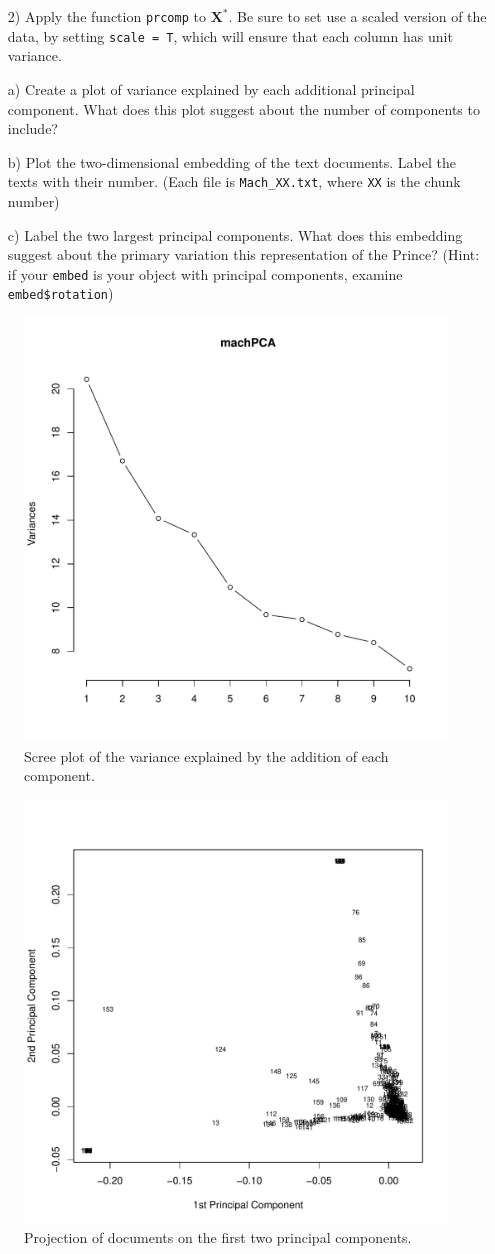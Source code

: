 \documentclass[12pt,letterpaper]{article}
\begin{document}
\begin{itemize}
\item[2)] Apply the function {\tt prcomp} to $\boldsymbol{X}^{*}$. Be sure to set use a scaled version of the data, by setting {\tt scale = T}, which will ensure that each column has unit variance.
\item[a)] Create a plot of variance explained by each additional principal component. What does this plot suggest about the number of components to include?
\item[b)] Plot the two-dimensional embedding of the text documents.  Label the texts with their number.  (Each file is {\tt Mach\_XX.txt}, where {\tt XX} is the chunk number)
\item[c)] Label the two largest principal components.  What does this embedding suggest about the primary variation this representation of the Prince?  (Hint: if your {\tt embed} is your object with principal components, examine {\tt embed\$rotation})
\end{itemize}

  

\begin{figure}[H]
  \caption{\footnotesize{Scree plot of the variance explained by the addition of each component.}}
  \centering
   \includegraphics[width=.55\linewidth]{HW5screePlot.pdf}
\end{figure}

\begin{figure}[H]
  \caption{\footnotesize{Projection of documents on the first two principal components.}}
  \centering
   \includegraphics[width=.6\linewidth]{HW5pcaEmbedding.pdf}
\end{figure}
\end{document}
